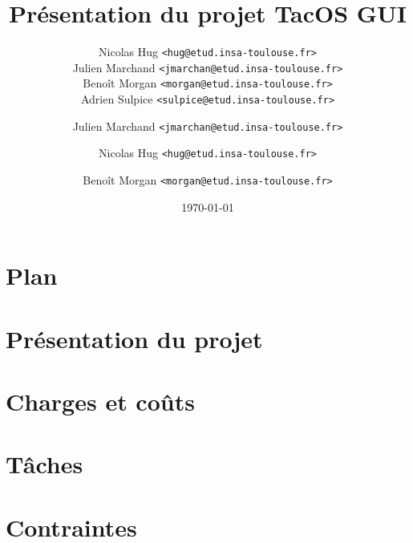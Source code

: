 \documentclass[xcolor=table,12pt]{beamer}
\title{Présentation du projet TacOS GUI}
\author[TacOS GUI Team (hug, jmarchan, morgan, sulpice)]{Nicolas Hug \texttt{<hug@etud.insa-toulouse.fr>}\\
Julien Marchand \texttt{<jmarchan@etud.insa-toulouse.fr>}\\
Benoît Morgan \texttt{<morgan@etud.insa-toulouse.fr>}\\
Adrien Sulpice \texttt{<sulpice@etud.insa-toulouse.fr>}}
\institute{INSA de Toulouse}
\date{\today}
\begin{document}

\frame{\titlepage}

\section[Plan]{Plan}
\frame{\tableofcontents}

\section{Présentation du projet}

\author{Julien Marchand \texttt{<jmarchan@etud.insa-toulouse.fr>}}
\section{Charges et coûts}

\author{Nicolas Hug \texttt{<hug@etud.insa-toulouse.fr>}}
\section{Tâches}

\author{Benoît Morgan \texttt{<morgan@etud.insa-toulouse.fr>}}
\section{Contraintes}

\end{document}

